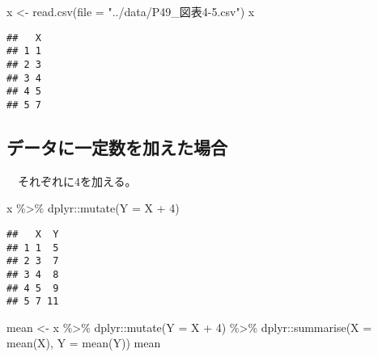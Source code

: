 \documentclass[
  12pt,
]{book}
\newenvironment{Shaded}{\begin{snugshade}}{\end{snugshade}}
\newcommand{\AttributeTok}[1]{\textcolor[rgb]{0.77,0.63,0.00}{#1}}
\newcommand{\DecValTok}[1]{\textcolor[rgb]{0.00,0.00,0.81}{#1}}
\newcommand{\FunctionTok}[1]{\textcolor[rgb]{0.00,0.00,0.00}{#1}}
\newcommand{\NormalTok}[1]{#1}
\newcommand{\OtherTok}[1]{\textcolor[rgb]{0.56,0.35,0.01}{#1}}
\newcommand{\SpecialCharTok}[1]{\textcolor[rgb]{0.00,0.00,0.00}{#1}}
\newcommand{\StringTok}[1]{\textcolor[rgb]{0.31,0.60,0.02}{#1}}
\begin{document}
\begin{Shaded}
\begin{Highlighting}[]
\NormalTok{x }\OtherTok{\textless{}{-}} \FunctionTok{read.csv}\NormalTok{(}\AttributeTok{file =} \StringTok{"../data/P49\_図表4{-}5.csv"}\NormalTok{)}
\NormalTok{x}
\end{Highlighting}
\end{Shaded}

\begin{verbatim}
##   X
## 1 1
## 2 3
## 3 4
## 4 5
## 5 7
\end{verbatim}

\hypertarget{ux30c7ux30fcux30bfux306bux4e00ux5b9aux6570ux3092ux52a0ux3048ux305fux5834ux5408}{%
\subsection*{データに一定数を加えた場合}\label{ux30c7ux30fcux30bfux306bux4e00ux5b9aux6570ux3092ux52a0ux3048ux305fux5834ux5408}}

　それぞれに\(4\)を加える。

\begin{Shaded}
\begin{Highlighting}[]
\NormalTok{x }\SpecialCharTok{\%\textgreater{}\%} 
\NormalTok{  dplyr}\SpecialCharTok{::}\FunctionTok{mutate}\NormalTok{(}\AttributeTok{Y =}\NormalTok{ X }\SpecialCharTok{+} \DecValTok{4}\NormalTok{)}
\end{Highlighting}
\end{Shaded}

\begin{verbatim}
##   X  Y
## 1 1  5
## 2 3  7
## 3 4  8
## 4 5  9
## 5 7 11
\end{verbatim}

\begin{Shaded}
\begin{Highlighting}[]
\NormalTok{mean }\OtherTok{\textless{}{-}}\NormalTok{ x }\SpecialCharTok{\%\textgreater{}\%} 
\NormalTok{  dplyr}\SpecialCharTok{::}\FunctionTok{mutate}\NormalTok{(}\AttributeTok{Y =}\NormalTok{ X }\SpecialCharTok{+} \DecValTok{4}\NormalTok{) }\SpecialCharTok{\%\textgreater{}\%} 
\NormalTok{  dplyr}\SpecialCharTok{::}\FunctionTok{summarise}\NormalTok{(}\AttributeTok{X =} \FunctionTok{mean}\NormalTok{(X), }\AttributeTok{Y =} \FunctionTok{mean}\NormalTok{(Y))}
\NormalTok{mean}
\end{Highlighting}
\end{Shaded}
\end{document}
